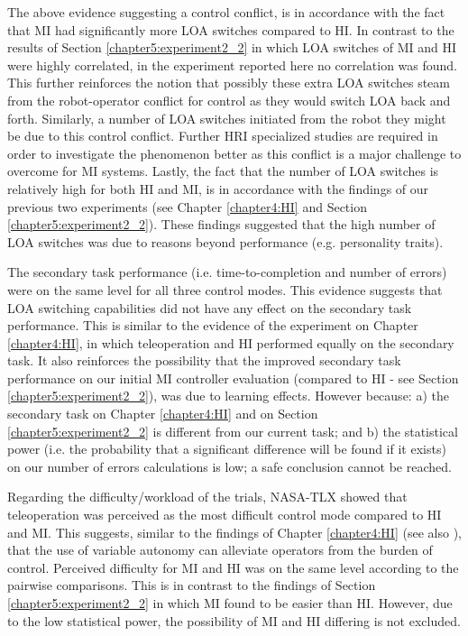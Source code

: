 \documentclass[a4paper,12pt,oneside,openright]{bhamthesis}
\begin{document}
The above evidence suggesting a control conflict, is in accordance with the fact that MI had significantly more LOA switches compared to HI. In contrast to the results of Section \ref{chapter5:experiment2_2} in which LOA switches of MI and HI were highly correlated, in the experiment reported here no correlation was found. This further reinforces the notion that possibly these extra LOA switches steam from the robot-operator conflict for control as they would switch LOA back and forth. Similarly, a number of LOA switches initiated from the robot they might be due to this control conflict. Further HRI specialized studies are required in order to investigate the phenomenon better as this conflict is a major challenge to overcome for MI systems. Lastly, the fact that the number of LOA switches is relatively high for both HI and MI, is in accordance with the findings of our previous two experiments (see Chapter \ref{chapter4:HI} and Section \ref{chapter5:experiment2_2}). These findings suggested that the high number of LOA switches was due to reasons beyond performance (e.g. personality traits).

The secondary task performance (i.e. time-to-completion and number of errors) were on the same level for all three control modes. This evidence suggests that LOA switching capabilities did not have any effect on the secondary task performance. This is similar to the evidence of the experiment on Chapter \ref{chapter4:HI}, in which teleoperation and HI performed equally on the secondary task. It also reinforces the possibility that the improved secondary task performance on our initial MI controller evaluation (compared to HI - see Section \ref{chapter5:experiment2_2}), was due to learning effects. However because: a) the secondary task on Chapter \ref{chapter4:HI} and on Section \ref{chapter5:experiment2_2} is different from our current task; and b) the statistical power (i.e. the probability that a significant difference will be found if it exists) on our number of errors calculations is low; a safe conclusion cannot be reached.

Regarding the difficulty/workload of the trials, NASA-TLX showed that teleoperation was perceived as the most difficult control mode compared to HI and MI. This suggests, similar to the findings of Chapter \ref{chapter4:HI} (see also \citep{Chiou2016}), that the use of variable autonomy can alleviate operators from the burden of control. Perceived difficulty for MI and HI was on the same level according to the pairwise comparisons. This is in contrast to the findings of Section \ref{chapter5:experiment2_2} in which MI found to be easier than HI. However, due to the low statistical power, the possibility of MI and HI differing is not excluded.
\end{document}
